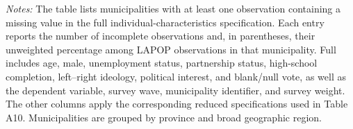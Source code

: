 \begin{landscape}
\begin{minipage}{0.98\linewidth}
\footnotesize\setlength{\parindent}{0pt}
\textit{Notes:} The table lists municipalities with at least one observation containing a missing value in the full individual-characteristics specification. Each entry reports the number of incomplete observations and, in parentheses, their unweighted percentage among LAPOP observations in that municipality. Full includes age, male, unemployment status, partnership status, high-school completion, left--right ideology, political interest, and blank/null vote, as well as the dependent variable, survey wave, municipality identifier, and survey weight. The other columns apply the corresponding reduced specifications used in Table A10. Municipalities are grouped by province and broad geographic region.
\end{minipage}
\endgroup
\end{landscape}
